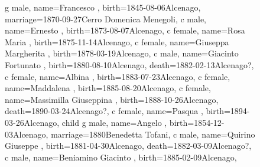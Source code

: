 \documentclass{article}
\begin{document}
\begin{figure}
\begin{minipage}[b]{0.19\textwidth}
\begin{genealogypicture}
{{{{                    g{
                        male,
                        name={Francesco },
                        birth={1845-08-06}{Alcenago},
                        marriage={1870-09-27}{Cerro \newline Domenica Menegoli},
                    }
                    c{
                        male,
                        name={Ernesto },
                        birth={1873-08-07}{Alcenago},
                    }
                    c{
                        female,
                        name={Rosa Maria },
                        birth={1875-11-14}{Alcenago},
                    }
                    c{
                        female,
                        name={Giuseppa Margherita },
                        birth={1878-03-19}{Alcenago},
                    }
                    c{
                        male,
                        name={Giacinto Fortunato },
                        birth={1880-08-10}{Alcenago},
                        death={1882-02-13}{Alcenago?},
                    }
                    c{
                        female,
                        name={Albina },
                        birth={1883-07-23}{Alcenago},
                    }
                    c{
                        female,
                        name={Maddalena },
                        birth={1885-08-20}{Alcenago},
                    }
                    c{
                        female,
                        name={Massimilla Giuseppina },
                        birth={1888-10-26}{Alcenago},
                        death={1890-03-24}{Alcenago?},
                    }
                    c{
                        female,
                        name={Pasqua },
                        birth={1894-03-26}{Alcenago},
                    }
                }
                child{
                    g{
                        male,
                        name={Angelo },
                        birth={1854-12-03}{Alcenago},
                        marriage={1880}{Benedetta Tofani},
                    }
                    c{
                        male,
                        name={Quirino Giuseppe },
                        birth={1881-04-30}{Alcenago},
                        death={1882-03-09}{Alcenago?},
                    }
                    c{
                        male,
                        name={Beniamino Giacinto },
                        birth={1885-02-09}{Alcenago},
                    }
                }
            }
        }
    }
    \end{genealogypicture}


\end{minipage}
\end{figure}
\end{document}
